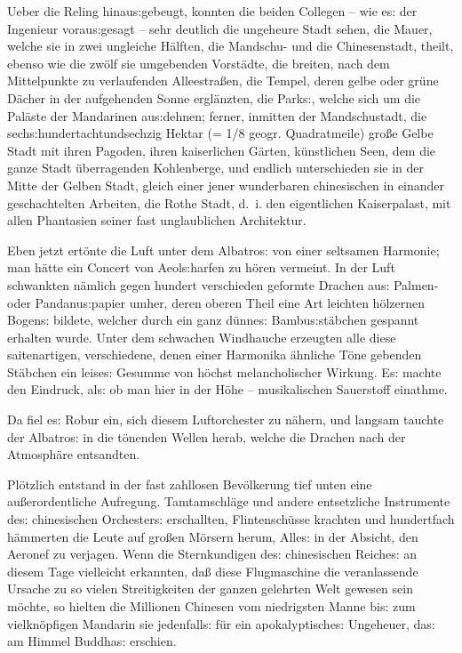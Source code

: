 \documentclass[oneside,12pt]{book}
\newcommand{\s}{s:}
\begin{document}
Ueber die Reling hinau{\s}gebeugt, konnten die beiden Collegen -- wie
e{\s} der Ingenieur vorau{\s}gesagt -- sehr deutlich die ungeheure
Stadt sehen, die Mauer, welche sie in zwei ungleiche H\"alften, die
Mandschu- und die Chinesenstadt, theilt, ebenso wie die zw\"olf sie
umgebenden Vorst\"adte, die breiten, nach dem Mittelpunkte zu
verlaufenden Alleestra{\ss}en, die Tempel, deren gelbe oder gr\"une
D\"acher in der aufgehenden Sonne ergl\"anzten, die Park{\s}, welche
sich um die Pal\"aste der Mandarinen au{\s}dehnen; ferner, inmitten
der Mandschustadt, die sech{\s}hundertachtundsechzig Hektar (= 1/8
geogr. Quadratmeile) gro{\ss}e Gelbe Stadt mit ihren Pagoden, ihren
kaiserlichen G\"arten, k\"unstlichen Seen, dem die ganze Stadt
\"uberragenden Kohlenberge, und endlich unterschieden sie in der
Mitte der Gelben Stadt, gleich einer jener wunderbaren chinesischen
in einander geschachtelten Arbeiten, die Rothe Stadt, d.~i. den
eigentlichen Kaiserpalast, mit allen Phantasien seiner fast
unglaublichen Architektur.

Eben jetzt ert\"onte die Luft unter dem {\glqq}Albatro{\s}{\grqq} von
einer seltsamen Harmonie; man h\"atte ein Concert von Aeol{\s}harfen
zu h\"oren vermeint. In der Luft schwankten n\"amlich gegen hundert
verschieden geformte Drachen au{\s} Palmen- oder Pandanu{\s}papier
umher, deren oberen Theil eine Art leichten h\"olzernen Bogen{\s}
bildete, welcher durch ein ganz d\"unne{\s} Bambu{\s}st\"abchen
gespannt erhalten wurde. Unter dem schwachen Windhauche erzeugten
alle diese saitenartigen, verschiedene, denen einer Harmonika
\"ahnliche T\"one gebenden St\"abchen ein leise{\s} Gesumme von
h\"ochst melancholischer Wirkung. E{\s} machte den Eindruck, al{\s}
ob man hier in der H\"ohe -- musikalischen Sauerstoff einathme.

Da fiel e{\s} Robur ein, sich diesem Luftorchester zu n\"ahern, und
langsam tauchte der {\glqq}Albatro{\s}{\grqq} in die t\"onenden
Wellen herab, welche die Drachen nach der Atmosph\"are entsandten.

Pl\"otzlich entstand in der fast zahllosen Bev\"olkerung tief unten
eine au{\ss}erordentliche Aufregung. Tamtamschl\"age und andere
entsetzliche Instrumente de{\s} chinesischen Orchester{\s}
erschallten, Flintensch\"usse krachten und hundertfach h\"ammerten
die Leute auf gro{\ss}en M\"orsern herum, Alle{\s} in der Absicht,
den Aeronef zu verjagen. Wenn die Sternkundigen de{\s} chinesischen
Reiche{\s} an diesem Tage vielleicht erkannten, da{\ss} diese
Flugmaschine die veranlassende Ursache zu so vielen Streitigkeiten
der ganzen gelehrten Welt gewesen sein m\"ochte, so hielten die
Millionen Chinesen vom niedrigsten Manne bi{\s} zum vielkn\"opfigen
Mandarin sie jedenfall{\s} f\"ur ein apokalyptische{\s} Ungeheuer,
da{\s} am Himmel Buddha{\s} erschien.
\end{document}
